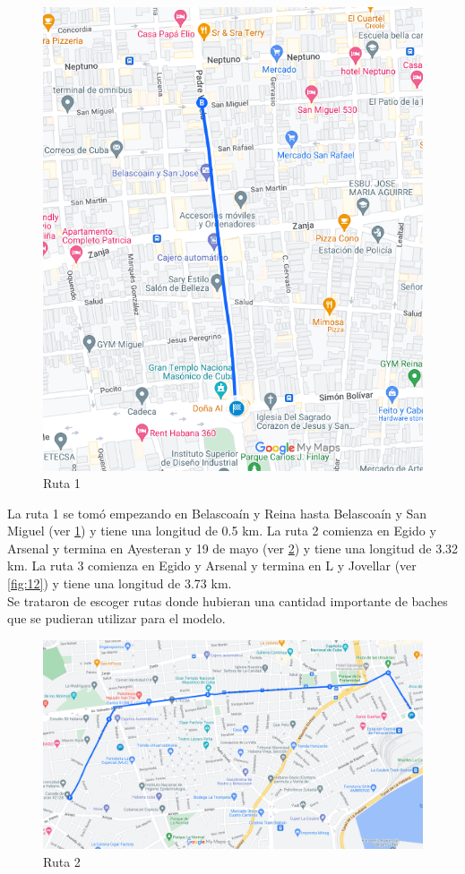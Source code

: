 	\begin{figure}[htb]
		\centering
		\includegraphics[scale = 0.5]{Graphics/route_1_BelascoainyReina_BelascoainySanMiguel.png}
		\caption{Ruta 1}
		\label{fig:10}
	\end{figure}

	La ruta 1 se tomó empezando en Belascoaín y Reina hasta Belascoaín y San Miguel (ver \ref{fig:10}) y tiene una longitud de 0.5 km. La ruta
	2 comienza en Egido y Arsenal y termina en Ayesteran y 19 de mayo (ver \ref{fig:11}) y tiene una longitud de 3.32 km. La ruta 3 comienza en
	Egido y Arsenal y termina en L y Jovellar (ver \ref{fig:12}) y tiene una longitud de 3.73 km.\\ \indent Se trataron de escoger rutas donde
	hubieran una cantidad importante de baches que se pudieran utilizar para el modelo.
	\newpage

	\begin{figure}[htb]
		\centering
		\includegraphics[scale = 0.4]{Graphics/route_2_EgidoArsenal_Ayesteran19deMayo.png}
		\caption{Ruta 2}
		\label{fig:11}
	\end{figure}

